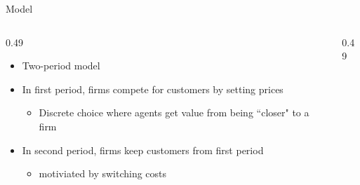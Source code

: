 \documentclass[aspectratio=169]{beamer}
\begin{document}
\begin{frame}{Model}
    \begin{columns}[T,onlytextwidth]
        \begin{column}{0.49\textwidth}
            \begin{itemize}
                \item Two-period model
                \item In first period, firms compete for customers by setting prices
                \begin{itemize}
                    \item Discrete choice where agents get value from being ``closer" to a firm
                \end{itemize}
                \item In second period, firms keep customers from first period
                \begin{itemize}
                    \item motiviated by switching costs
                \end{itemize}
            \end{itemize}
        \end{column}
        \begin{column}{0.49\textwidth}
            \raggedleft
            \resizebox{!}{0.43\textheight}{}
        \end{column}
    \end{columns}

    \vspace{0.35cm}
    \centering
    \resizebox{0.88\linewidth}{!}{}
\end{frame}
\end{document}
